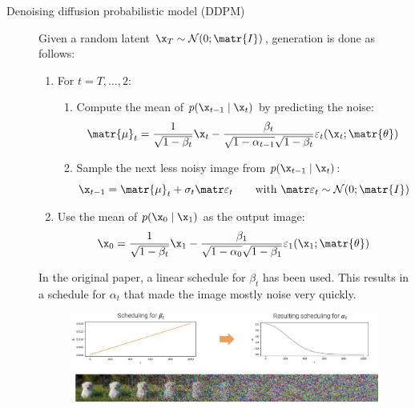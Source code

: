 \begin{description}
    \item[Denoising diffusion probabilistic model (DDPM)] 
        Given a random latent $\x_T \sim \mathcal{N}(0; \matr{I})$, generation is done as follows:
        \begin{enumerate}
            \item For $t = T, \dots, 2$:
                \begin{enumerate}
                    \item Compute the mean of $p(\x_{t-1} \mid \x_t)$ by predicting the noise:
                    \[ \matr{\mu}_t = \frac{1}{\sqrt{1-\beta_t}}\x_t - \frac{\beta_t}{\sqrt{1-\alpha_{t-1}}\sqrt{1-\beta_t}} \varepsilon_t(\x_t; \matr{\theta}) \]
                    \item Sample the next less noisy image from $p(\x_{t-1} \mid \x_t)$:
                    \[ \x_{t-1} = \matr{\mu}_t + \sigma_t \noise_t \qquad \text{with } \noise_t \sim \mathcal{N}(0; \matr{I}) \]
                \end{enumerate}
            \item Use the mean of $p(\x_0 \mid \x_1)$ as the output image:
            \[ \x_0 = \frac{1}{\sqrt{1-\beta_t}}\x_1 - \frac{\beta_1}{\sqrt{1-\alpha_{0}}\sqrt{1-\beta_1}} \varepsilon_1(\x_1; \matr{\theta}) \]
        \end{enumerate}

        \begin{remark}
            In the original paper, a linear schedule for $\beta_t$ has been used. This results in a schedule for $\alpha_t$ that made the image mostly noise very quickly.

            \begin{figure}[H]
                \centering
                \includegraphics[width=0.9\linewidth]{./img/ddpm_schedule.jpg}
            \end{figure}
        \end{remark}


\end{description}
